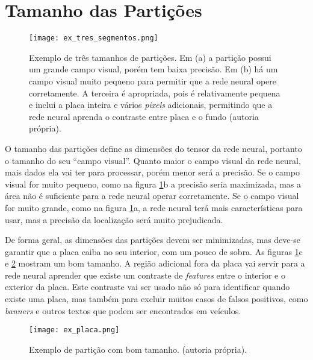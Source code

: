 \section{Tamanho das Partições}
\begin{figure}[!htb]
	\centering
	\texttt{[image: ex\_tres\_segmentos.png]}
	\caption[Exemplo de três tamanhos de partições]{
		Exemplo de três tamanhos de partições.
		Em (a) a partição possui um grande campo visual, porém tem baixa precisão.
		Em (b) há um campo visual muito pequeno para permitir que a rede neural
		opere corretamente. A terceira é apropriada, pois é relativamente pequena e
		inclui a placa inteira e vários \emph{pixels} adicionais, permitindo que a
		rede neural aprenda o contraste entre placa e o fundo (autoria própria).}
	\label{fig:ex_tres_segmentos}
\end{figure}

O tamanho das partições define as dimensões do tensor da rede neural, portanto
o tamanho do seu ``campo visual''.
Quanto maior o campo visual da rede neural, mais dados ela vai ter para
processar, porém menor será a precisão. Se o campo visual for muito pequeno,
como na figura \ref{fig:ex_tres_segmentos}b a precisão seria maximizada,
mas a área não é suficiente para a rede neural operar corretamente. Se
o campo visual for muito grande, como na figura \ref{fig:ex_tres_segmentos}a,
a rede neural terá mais características para usar, mas a precisão da
localização será muito prejudicada.

De forma geral, as dimensões das partições devem ser minimizadas, mas deve-se
garantir que a placa caiba no seu interior, com um pouco de
sobra. As figuras \ref{fig:ex_tres_segmentos}c e \ref{fig:ex_placa} mostram
um bom tamanho. A região adicional fora da placa vai servir para a rede
neural aprender que existe um contraste de \emph{features} entre o
interior e o exterior da placa. Este contraste vai ser usado não só para
identificar quando existe uma placa, mas também para excluir muitos casos de
falsos positivos, como \emph{banners} e outros textos que podem ser
encontrados em veículos.

\begin{figure}[!htb]
	\centering
	\texttt{[image: ex\_placa.png]}
	\caption[Exemplo de partição com bom tamanho]{
		Exemplo de partição com bom tamanho.
		(autoria própria).}
	\label{fig:ex_placa}
\end{figure}


